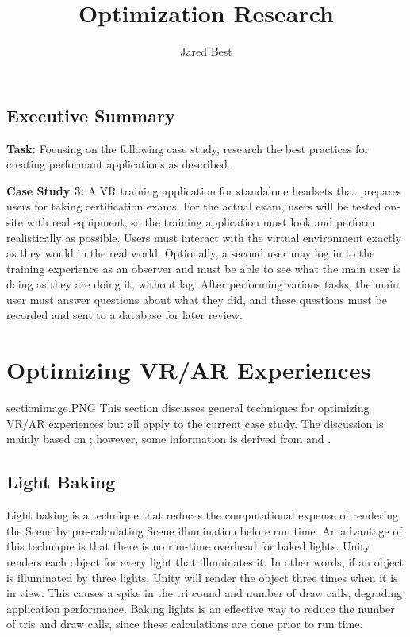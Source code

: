 \documentclass{Style}
\title{Optimization Research} %
\author{Jared Best} %
\begin{document}

\subsection{Executive Summary}
\textbf{Task:} Focusing on the following case study, research the best practices for creating performant applications as described.

\textbf{Case Study 3:} A VR training application for standalone headsets that prepares users for taking certification exams. For the actual exam, users will be tested on-site with real equipment, so the training application must look and perform realistically as possible. Users must interact with the virtual environment exactly as they would in the real world. Optionally, a second user may log in to the training experience as an observer and must be able to see what the main user is doing as they are doing it, without lag. After performing various tasks, the main user must answer questions about what they did, and these questions must be recorded and sent to a database for later review.  

\section{Optimizing VR/AR Experiences}{sectionimage.PNG}
This section discusses general techniques for optimizing VR/AR experiences but all apply to the current case study. The discussion is mainly based on \citet{Unity2020OptimizingYourVRARExperiences}; however, some information is derived from \citet{Unity2021FixingPerformanceProblems} and \citet{Unity2021OptimizingGraphicsPerformance}.

\subsection{Light Baking}
Light baking is a technique that reduces the computational expense of rendering the Scene by pre-calculating Scene illumination before run time. An advantage of this technique is that there is no run-time overhead for baked lights. Unity renders each object for every light that illuminates it. In other words, if an object is illuminated by three lights, Unity will render the object three times when it is in view. This causes a spike in the tri cound and number of draw calls, degrading application performance. Baking lights is an effective way to reduce the number of tris and draw calls, since these calculations are done prior to run time.
\end{document}
